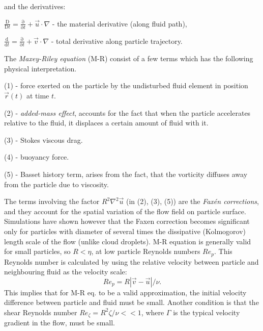 \documentclass[../main.tex]{subfiles}
\begin{document}
and the derivatives:
\begin{description}
\item $\frac{\mathrm{D}}{\mathrm{D}t}=\frac{\mathrm{\partial}}{\mathrm{\partial}t}+\vec{u} \cdot \nabla$ - the material derivative (along fluid path), 
\item $\frac{\mathrm{d}}{\mathrm{d}t}=\frac{\mathrm{\partial}}{\mathrm{\partial}t}+\vec{v} \cdot \nabla$ - total derivative along particle trajectory.
\end{description}

The \emph{Maxey-Riley equation} (M-R) consist of a few terms which has the following physical interpretation.
\begin{description}
\item (1) - force exerted on the particle by the undisturbed fluid element in position $\vec{r}(t)$ at time $t$.
\item (2) - \emph{added-mass effect}, accounts for the fact that when the particle accelerates relative to the fluid, it displaces a certain amount of fluid with it.
\item (3) - Stokes viscous drag.
\item (4) - buoyancy force.
\item (5) - Basset history term, arises from the fact, that the vorticity diffuses away from the particle due to viscosity.
\end{description}
The terms involving the factor $R^2 \nabla^2 \vec{u}$ (in (2), (3), (5)) are the \emph{Faxén corrections}, and they account for the spatial variation of the flow field on particle surface. Simulations have shown  however \citep{Calzavarini2012} that the Faxen correction becomes significant only for particles with diameter of several times the dissipative (Kolmogorov) length scale of the flow (unlike cloud droplets). M-R equation is generally valid for small particles, so $R<\eta$, at low particle Reynolds numbers $Re_p$. This Reynolds number is calculated by using the relative velocity between particle and neighbouring fluid as the velocity scale: 
\begin{equation}
Re_p = R|\vec{v} - \vec{u}|/\nu.
\label{def:Rep}
\end{equation}
This implies that for M-R eq. to be a valid approximation, the initial velocity difference between particle and fluid must be small. Another condition is that the shear Reynolds number $Re_{\zeta} = R^2 \zeta/\nu<<1$, where $\Gamma$ is the typical velocity gradient in the flow, must be small.\\
\end{document}
